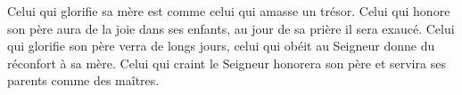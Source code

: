 Celui qui glorifie sa mère est comme celui qui amasse un trésor.
Celui qui honore son père aura de la joie dans ses enfants,
	au jour de sa prière il sera exaucé.
Celui qui glorifie son père verra de longs jours,
	celui qui obéit au Seigneur donne du réconfort à sa mère.
Celui qui craint le Seigneur honorera son père et servira ses parents comme des maîtres.
